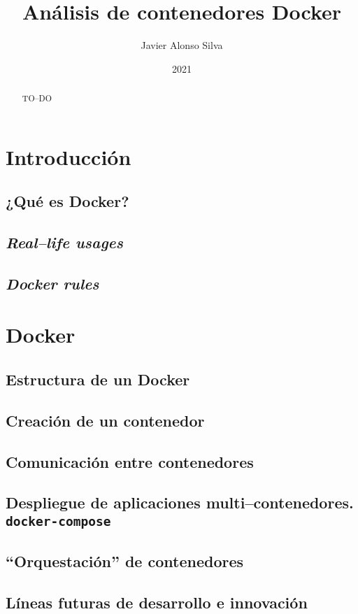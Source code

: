 \documentclass[a4paper,oneside,12pt]{article}
\author{Javier Alonso Silva}
\title{Análisis de contenedores Docker}
\date{2021}
\newcommand{\settttsize}[1]{\def\ttsize{#1}}%
\begin{document}
\settttsize{\footnotesize}
\ActivateVerbatimLigatures


\newpage
\begin{abstract}
  TO--DO
\end{abstract}

\newpage
\tableofcontents
\newpage
{}

\section{Introducción}

\subsection{¿Qué es Docker?}

\subsection{\textit{Real--life usages}}

\subsection{\textit{Docker rules}}

\section{Docker}
\subsection{Estructura de un Docker}
\subsection{Creación de un contenedor}
\subsection{Comunicación entre contenedores}
\subsection{Despliegue de aplicaciones multi--contenedores. \texttt{docker-compose}}
\subsection{``Orquestación'' de contenedores}
\subsection{Líneas futuras de desarrollo e innovación}
\end{document}

